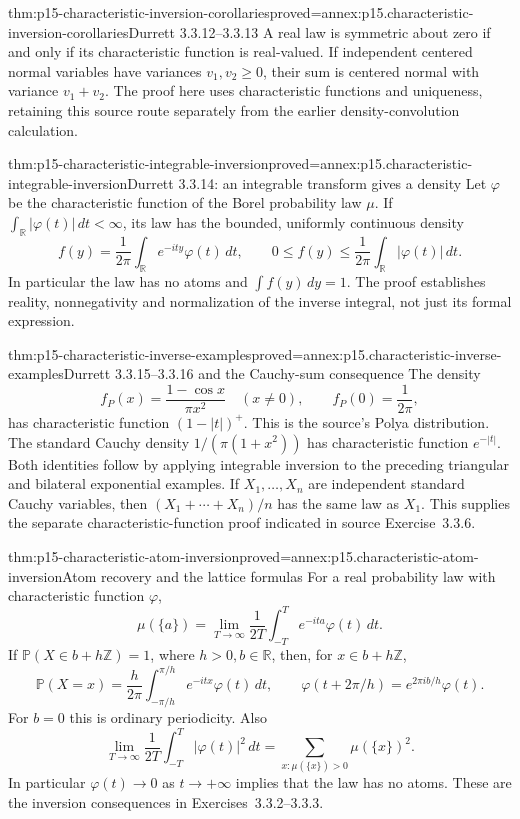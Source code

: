 \begin{hbcorollary}{thm:p15-characteristic-inversion-corollaries}{proved=annex:p15.characteristic-inversion-corollaries}{Durrett 3.3.12--3.3.13}
A real law is symmetric about zero if and only if its
characteristic function is real-valued.
If independent centered normal variables have variances
\(v_1,v_2\geq0\), their sum is centered normal with variance
\(v_1+v_2\).
The proof here uses characteristic functions and uniqueness,
retaining this source route separately from the earlier
density-convolution calculation.
\end{hbcorollary}

\begin{hbtheorem}{thm:p15-characteristic-integrable-inversion}{proved=annex:p15.characteristic-integrable-inversion}{Durrett 3.3.14: an integrable transform gives a density}
Let \(\varphi\) be the characteristic function of the Borel
probability law \(\mu\).
If \(\int_{\mathbb R}|\varphi(t)|\,dt<\infty\), its law
has the bounded, uniformly continuous density
\[
 f(y)=\frac1{2\pi}\int_{\mathbb R}e^{-ity}\varphi(t)\,dt,
 \qquad
 0\leq f(y)\leq\frac1{2\pi}\int_{\mathbb R}|\varphi(t)|\,dt.
\]
In particular the law has no atoms and \(\int f(y)\,dy=1\).
The proof establishes reality, nonnegativity and normalization
of the inverse integral, not just its formal expression.
\end{hbtheorem}

\begin{hbtheorem}{thm:p15-characteristic-inverse-examples}{proved=annex:p15.characteristic-inverse-examples}{Durrett 3.3.15--3.3.16 and the Cauchy-sum consequence}
The density
\[
 f_P(x)=\frac{1-\cos x}{\pi x^2}\quad(x\ne0),\qquad
 f_P(0)=\frac1{2\pi},
\]
has characteristic function \((1-|t|)^+\).
This is the source's Polya distribution.
The standard Cauchy density \(1/(\pi(1+x^2))\) has
characteristic function \(e^{-|t|}\).
Both identities follow by applying integrable inversion to
the preceding triangular and bilateral exponential examples.
If \(X_1,\ldots,X_n\) are independent standard Cauchy variables,
then \((X_1+\cdots+X_n)/n\) has the same law as \(X_1\).
This supplies the separate characteristic-function proof
indicated in source Exercise~3.3.6.
\end{hbtheorem}

\begin{hbtheorem}{thm:p15-characteristic-atom-inversion}{proved=annex:p15.characteristic-atom-inversion}{Atom recovery and the lattice formulas}
For a real probability law with characteristic function \(\varphi\),
\[
 \mu(\{a\})=\lim_{T\to\infty}\frac1{2T}
                   \int_{-T}^T e^{-ita}\varphi(t)\,dt.
\]
If \(\mathbb P(X\in b+h\mathbb Z)=1\), where \(h>0,b\in\mathbb R\),
then, for \(x\in b+h\mathbb Z\),
\[
 \mathbb P(X=x)=\frac h{2\pi}
          \int_{-\pi/h}^{\pi/h}e^{-itx}\varphi(t)\,dt,\qquad
 \varphi(t+2\pi/h)=e^{2\pi ib/h}\varphi(t).
\]
For \(b=0\) this is ordinary periodicity.
Also
\[
 \lim_{T\to\infty}\frac1{2T}\int_{-T}^T|\varphi(t)|^2\,dt
          =\sum_{x:\mu(\{x\})>0}\mu(\{x\})^2.
\]
In particular \(\varphi(t)\to0\) as \(t\to+\infty\) implies
that the law has no atoms. These are the inversion consequences
in Exercises~3.3.2--3.3.3.
\end{hbtheorem}

